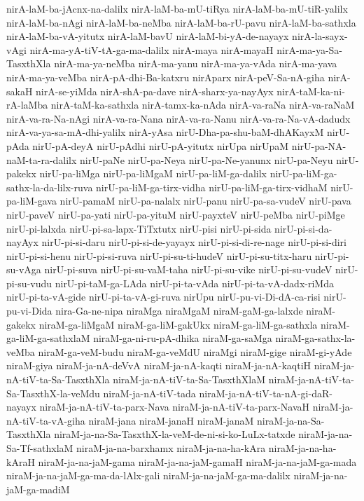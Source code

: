 {nirA-laM-ba-jAcnx-na-dalilx
nirA-laM-ba-mU-tiRya
nirA-laM-ba-mU-tiR-yalilx
nirA-laM-ba-nAgi
nirA-laM-ba-neMba
nirA-laM-ba-rU-pavu
nirA-laM-ba-sathxla
nirA-laM-ba-vA-yitutx
nirA-laM-bavU
nirA-laM-bi-yA-de-nayayx
nirA-la-sayx-vAgi
nirA-ma-yA-tiV-tA-ga-ma-dalilx
nirA-maya
nirA-mayaH
nirA-ma-ya-Sa-TasxthXla
nirA-ma-ya-neMba
nirA-ma-yanu
nirA-ma-ya-vAda
nirA-ma-yava
nirA-ma-ya-veMba
nirA-pA-dhi-Ba-katxru
nirAparx
nirA-peV-Sa-nA-giha
nirA-sakaH
nirA-se-yiMda
nirA-shA-pa-dave
nirA-sharx-ya-nayAyx
nirA-taM-ka-ni-rA-laMba
nirA-taM-ka-sathxla
nirA-tamx-ka-nAda
nirA-va-raNa
nirA-va-raNaM
nirA-va-ra-Na-nAgi
nirA-va-ra-Nana
nirA-va-ra-Nanu
nirA-va-ra-Na-vA-dadudx
nirA-va-ya-sa-mA-dhi-yalilx
nirA-yAsa
nirU-Dha-pa-shu-baM-dhAKayxM
nirU-pAda
nirU-pA-deyA
nirU-pAdhi
nirU-pA-yitutx
nirUpa
nirUpaM
nirU-pa-NA-naM-ta-ra-dalilx
nirU-paNe
nirU-pa-Neya
nirU-pa-Ne-yanunx
nirU-pa-Neyu
nirU-pakekx
nirU-pa-liMga
nirU-pa-liMgaM
nirU-pa-liM-ga-dalilx
nirU-pa-liM-ga-sathx-la-da-lilx-ruva
nirU-pa-liM-ga-tirx-vidha
nirU-pa-liM-ga-tirx-vidhaM
nirU-pa-liM-gava
nirU-pamaM
nirU-pa-nalalx
nirU-panu
nirU-pa-sa-vudeV
nirU-pava
nirU-paveV
nirU-pa-yati
nirU-pa-yituM
nirU-payxteV
nirU-peMba
nirU-piMge
nirU-pi-lalxda
nirU-pi-sa-lapx-TiTxtutx
nirU-pisi
nirU-pi-sida
nirU-pi-si-da-nayAyx
nirU-pi-si-daru
nirU-pi-si-de-yayayx
nirU-pi-si-di-re-nage
nirU-pi-si-diri
nirU-pi-si-henu
nirU-pi-si-ruva
nirU-pi-su-ti-hudeV
nirU-pi-su-titx-haru
nirU-pi-su-vAga
nirU-pi-suva
nirU-pi-su-vaM-taha
nirU-pi-su-vike
nirU-pi-su-vudeV
nirU-pi-su-vudu
nirU-pi-taM-ga-LAda
nirU-pi-ta-vAda
nirU-pi-ta-vA-dadx-riMda
nirU-pi-ta-vA-gide
nirU-pi-ta-vA-gi-ruva
nirUpu
nirU-pu-vi-Di-dA-ca-risi
nirU-pu-vi-Dida
nira-Ga-ne-nipa
niraMga
niraMgaM
niraM-gaM-ga-lalxde
niraM-gakekx
niraM-ga-liMgaM
niraM-ga-liM-gakUkx
niraM-ga-liM-ga-sathxla
niraM-ga-liM-ga-sathxlaM
niraM-ga-ni-ru-pA-dhika
niraM-ga-saMga
niraM-ga-sathx-la-veMba
niraM-ga-veM-budu
niraM-ga-veMdU
niraMgi
niraM-gige
niraM-gi-yAde
niraM-giya
niraM-ja-nA-deVvA
niraM-ja-nA-kaqti
niraM-ja-nA-kaqtiH
niraM-ja-nA-tiV-ta-Sa-TasxthXla
niraM-ja-nA-tiV-ta-Sa-TasxthXlaM
niraM-ja-nA-tiV-ta-Sa-TasxthX-la-veMdu
niraM-ja-nA-tiV-tada
niraM-ja-nA-tiV-ta-nA-gi-daR-nayayx
niraM-ja-nA-tiV-ta-parx-Nava
niraM-ja-nA-tiV-ta-parx-NavaH
niraM-ja-nA-tiV-ta-vA-giha
niraM-jana
niraM-janaH
niraM-janaM
niraM-ja-na-Sa-TasxthXla
niraM-ja-na-Sa-TasxthX-la-veM-de-ni-si-ko-LuLx-tatxde
niraM-ja-na-Sa-Tf-sathxlaM
niraM-ja-na-barxhamx
niraM-ja-na-ha-kAra
niraM-ja-na-ha-kAraH
niraM-ja-na-jaM-gama
niraM-ja-na-jaM-gamaH
niraM-ja-na-jaM-ga-mada
niraM-ja-na-jaM-ga-ma-da-lAlx-gali
niraM-ja-na-jaM-ga-ma-dalilx
niraM-ja-na-jaM-ga-madiM
}
